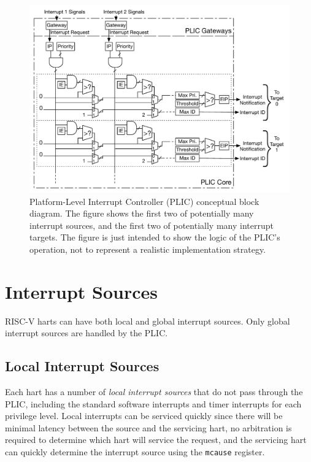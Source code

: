\begin{figure}[tb]
\centering
\includegraphics[width=\textwidth]{figs/PLIC-block-diagram.pdf}
\caption{Platform-Level Interrupt Controller (PLIC) conceptual block
  diagram.  The figure shows the first two of potentially many
  interrupt sources, and the first two of potentially many interrupt
  targets.  The figure is just intended to show the logic of the
  PLIC's operation, not to represent a realistic implementation
  strategy.}
\label{fig:plic}
\end{figure}

\section{Interrupt Sources}

RISC-V harts can have both local and global interrupt sources.  Only
global interrupt sources are handled by the PLIC.

\subsection{Local Interrupt Sources}

Each hart has a number of {\em local interrupt sources} that do not
pass through the PLIC, including the standard software interrupts and
timer interrupts for each privilege level.  Local interrupts can be
serviced quickly since there will be minimal latency between the
source and the servicing hart, no arbitration is required to determine
which hart will service the request, and the servicing hart can
quickly determine the interrupt source using the {\tt mcause}
register.

